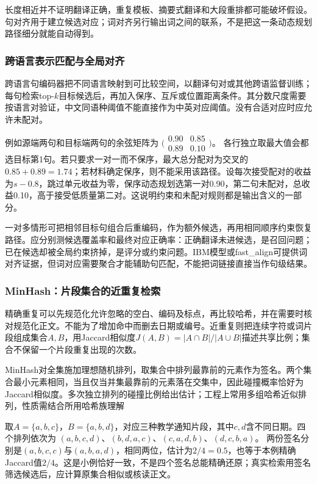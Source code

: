 长度相近并不证明翻译正确，重复模板、摘要式翻译和大段重排都可能破坏假设。句对齐用于建立候选对应；词对齐另行输出词之间的联系，不是把这一条动态规划路径细分就能自动得到。

\subsubsection{跨语言表示匹配与全局对齐}
\label{sec:nlp-classification-crosslingual-align}

跨语言句编码器把不同语言映射到可比较空间，以翻译句对或其他跨语监督训练；每句检索top-$k$目标候选后，再加入保序、互斥或位置距离条件。其分数尺度需要按语言对验证，中文同语种阈值不能直接作为中英对应阈值。没有合适对应时应允许未配对。

例如源端两句和目标端两句的余弦矩阵为
$\bigl(\begin{smallmatrix}0.90&0.85\\0.89&0.10\end{smallmatrix}\bigr)$。
各行独立取最大值会都选目标第1句。若只要求一对一而不保序，最大总分配对为交叉的$0.85+0.89=1.74$；若材料确定保序，则不能采用该路径。设每次接受配对的收益为$s-0.8$，跳过单元收益为零，保序动态规划选第一对0.90，第二句未配对，总收益0.10，高于接受低质量第二对。这说明约束和未配对规则都是输出含义的一部分。

一对多情形可把相邻目标句组合后重编码，作为额外候选，再用相同顺序约束恢复路径。应分别测候选覆盖率和最终对应正确率：正确翻译未进候选，是召回问题；已在候选却被全局约束挤掉，是评分或约束问题。IBM模型或fast\_align可提供词对齐证据，但词对应需要聚合才能辅助句匹配，不能把词链接直接当作句级结果。

\subsubsection{MinHash：片段集合的近重复检索}
\label{sec:nlp-classification-minhash}

精确重复可以先规范化允许忽略的空白、编码及标点，再比较哈希，并在需要时核对规范化正文。不能为了增加命中而删去日期或编号。近重复则把连续字符或词片段组成集合$A,B$，用Jaccard相似度$J(A,B)=|A\cap B|/|A\cup B|$描述共享比例；集合不保留一个片段重复出现的次数。

MinHash对全集施加理想随机排列，取集合中排列最靠前的元素作为签名。两个集合最小元素相同，当且仅当并集最靠前的元素落在交集中，因此碰撞概率恰好为Jaccard相似度。多次独立排列的碰撞比例给出估计；工程上常用多组哈希近似排列，性质需结合所用哈希族理解

取$A=\{a,b,c\}$，$B=\{a,b,d\}$，对应三种教学通知片段，其中$c,d$含不同日期。四个排列依次为
$(a,b,c,d)$、$(b,d,a,c)$、$(c,a,d,b)$、$(d,c,b,a)$。
两份签名分别是$(a,b,c,c)$与$(a,b,a,d)$，相同两位，估计为$2/4=0.5$，也等于本例精确Jaccard值$2/4$。这是小例恰好一致，不是四个签名总能精确还原；真实检索用签名筛选候选后，应计算原集合相似或核读正文。

